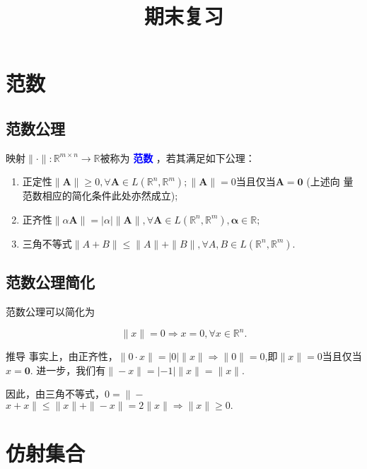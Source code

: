 \documentclass{lzureport}
\title{期末复习}
\date{\zhtoday}
\begin{document}
\makecover

%

\thispagestyle{empty}
\tableofcontents
\newpage 
\setcounter{page}{1}
\setcounter{equation}{0} %

\newpage

\section{范数}

\subsection{范数公理}

映射$\|\cdot\|:\mathbb{R}^{m\times n}\to\mathbb{R}$被称为 \textcolor{blue}{\textbf{范数}} ，若其满足如下公理：

\begin{enumerate}[label=\arabic*)]
	\item \textcolor{YBXPurple}{正定性}$\|\boldsymbol{A}\|\geq0,\forall\boldsymbol{A}\in L(\mathbb{R}^n,\mathbb{R}^m);\|\boldsymbol{A}\|=0$当且仅当$\boldsymbol{A}=\mathbf{0}$ (上述向
量范数相应的简化条件此处亦然成立);
	\item \textcolor{YBXPurple}{正齐性}$\|\alpha\boldsymbol{A}\|=|\alpha|\|\boldsymbol{A}\|,\forall\boldsymbol{A}\in L(\mathbb{R}^n,\mathbb{R}^m),\boldsymbol{\alpha}\in\mathbb{R};$ 
	\item \textcolor{YBXPurple}{三角不等式}$\|A+B\|\leq\|A\|+\|B\|,\forall A,B\in L(\mathbb{R}^n,\mathbb{R}^m).$
\end{enumerate}

\subsection{范数公理简化}
范数公理可以简化为 

$$\|x\|=0\Rightarrow x=0,\forall x\in\mathbb{R}^n.$$

\begin{derivation}{推导}
	事实上，由正齐性，$\|0\cdotp x\|=|0|\|x\|\Rightarrow\|0\|=0$,即$\|x\|=0$当且仅当$x=\mathbf{0}.$ 进一步，我们有$\|-x\|=|-1|\|x\|=\|x\|.$
	
	因此，由三角不等式，$0=\|-$ $x+x\|\leq\|x\|+\|-x\|=2\|x\|\Rightarrow\|x\|\geq0.$
\end{derivation}

\section{仿射集合}
\end{document}
